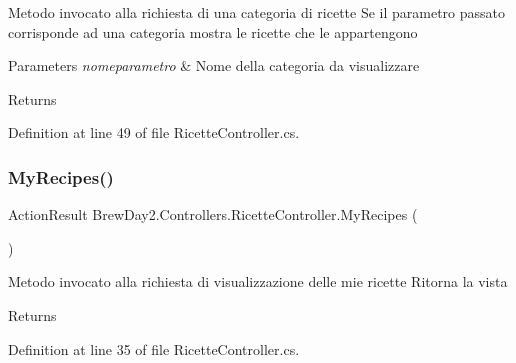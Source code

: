 Metodo invocato alla richiesta di una categoria di ricette Se il parametro passato corrisponde ad una categoria mostra le ricette che le appartengono 


\begin{DoxyParams}{Parameters}
{\em nomeparametro} & Nome della categoria da visualizzare\\
\hline
\end{DoxyParams}
\begin{DoxyReturn}{Returns}

\end{DoxyReturn}


Definition at line 49 of file Ricette\+Controller.\+cs.

\mbox{\label{class_brew_day2_1_1_controllers_1_1_ricette_controller_aa20670e970ff9a0141080d4d09d63ecd}} 
\subsubsection{\texorpdfstring{My\+Recipes()}{MyRecipes()}}
{\footnotesize\ttfamily Action\+Result Brew\+Day2.\+Controllers.\+Ricette\+Controller.\+My\+Recipes (\begin{DoxyParamCaption}{ }\end{DoxyParamCaption})}



Metodo invocato alla richiesta di visualizzazione delle mie ricette Ritorna la vista 

\begin{DoxyReturn}{Returns}

\end{DoxyReturn}


Definition at line 35 of file Ricette\+Controller.\+cs.

\mbox{\label{class_brew_day2_1_1_controllers_1_1_ricette_controller_abe2a5a4ebd4f966411eb313576afa5c7}} 
